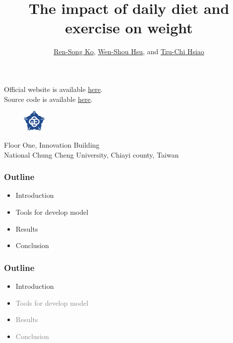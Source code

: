 \documentclass[fleqn]{beamer}
\title{
The impact of daily diet and exercise on weight
}
\author{
    \href{mailto: korenson@cs.ccu.edu.tw}{Ren-Song Ko}, \href{mailto: wisleyqqq0630@alum.ccu.edu.tw}{Wen-Shou Hsu}, and  \href{mailto: stchi111u@cs.ccu.edu.tw}{Tzu-Chi Hsiao}
}
\date{}
\begin{document}
\begin{frame}
  \titlepage
  \begin{center}
  Official website is available \href{https://tomtchsiao.github.io/project/}{here}. \\
  Source code is available \href{https://tomtchsiao.github.io/project/下載/index.html}{here}.
\end{center}
\begin{figure}[h]
    \centering
\includegraphics[width=0.10\textwidth]{logo.png}
\end{figure}
\begin{center}
  Floor One, Innovation Building \\
  National Chung Cheng University, Chiayi county, Taiwan
\end{center}
\end{frame}
\begin{frame}
\frametitle{Outline}
\begin{itemize}
        \item Introduction
        \vspace{0.15 cm}
        \item Tools for develop model
        \vspace{0.15 cm}
        \item Results
        \vspace{0.15 cm}
        \item Conclusion
        \vspace{0.15 cm}
\end{itemize}
\end{frame}
\begin{frame}
\frametitle{Outline}
\begin{itemize}
        \item Introduction
        \vspace{0.15 cm}
        \item \textcolor{gray}{Tools for develop model}
        \vspace{0.15 cm}
        \item \textcolor{gray}{Results}
        \vspace{0.15 cm}
        \item \textcolor{gray}{Conclusion}
        \vspace{0.15 cm}
\end{itemize}
\end{frame}
\end{document}
